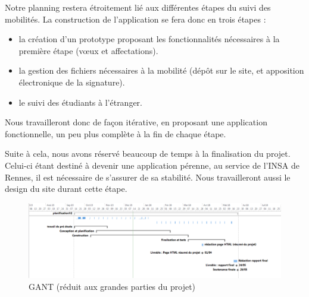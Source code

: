 Notre planning restera étroitement lié aux différentes étapes du suivi des mobilités. La construction de l'application se fera donc en trois étapes :
\begin{itemize}
 \item la création d'un prototype proposant les fonctionnalités nécessaires à la première étape (vœux et affectations).
 \item la gestion des fichiers nécessaires à la mobilité (dépôt sur le site, et apposition électronique de la signature).
 \item le suivi des étudiants à l'étranger.
\end{itemize}
Nous travailleront donc de façon itérative, en proposant une application fonctionnelle, un peu plus complète à la fin de chaque étape.


Suite à cela, nous avons réservé beaucoup de temps à la finalisation du projet. Celui-ci étant destiné à devenir une application pérenne, au service de l'INSA de Rennes, il est nécessaire de s'assurer de sa stabilité. Nous travailleront aussi le design du site durant cette étape. 

\begin{figure}[H]
	\centering
	\includegraphics[scale=0.5]{images/gant.PNG}
	\caption{GANT (réduit aux grandes parties du projet)}
\end{figure}

